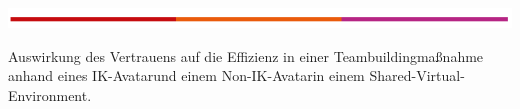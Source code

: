 \documentclass[a4paper,11pt]{article}%
\renewcommand{\\}{\vspace*{0.5\baselineskip} \newline}
\begin{document}
	\begin{titlepage}
		\begin{flushleft}
			\vspace*{-1cm}
			\includegraphics[scale=1]{Abbildungen/TH.png}\\
			\vspace*{1cm}
		\end{flushleft}
		
		\begin{huge}
			\noindent
			
			
			

Auswirkung des Vertrauens auf die Effizienz in einer Teambuildingmaßnahme anhand eines \flqq IK-Avatar\flqq und einem \flqq Non-IK-Avatar\frqq in einem Shared-Virtual-Environment. \\
		\end{huge}
		

\end{titlepage}
\end{document}
